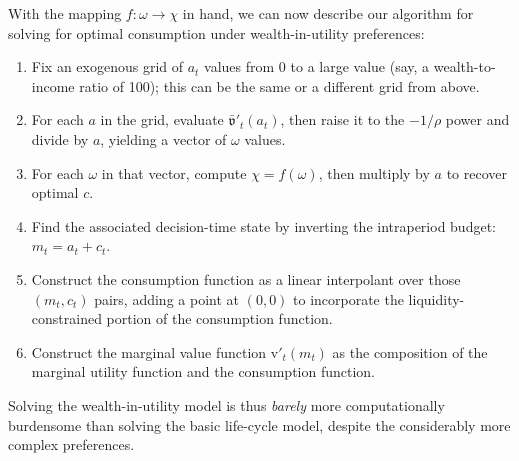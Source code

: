 \documentclass[12pt,letterpaper, fleqn]{article}
\newcommand{\CRRA}{\rho}
\newcommand{\vFunc}{\mathrm{v}}
\newcommand{\cNrm}{c}
\newcommand{\mNrm}{m}
\newcommand{\aNrm}{a}
\begin{document}
With the mapping $f : \omega \rightarrow \chi$ in hand, we can now describe our algorithm for solving for optimal consumption under wealth-in-utility preferences:

\begin{enumerate}
\item Fix an exogenous grid of $\aNrm_t$ values from 0 to a large value (say, a wealth-to-income ratio of 100); this can be the same or a different grid from above.

\item For each $\aNrm$ in the grid, evaluate $\bar{\mathfrak{v}}'_t(\aNrm_t)$, then raise it to the $-1/\CRRA$ power and divide by $\aNrm$, yielding a vector of $\omega$ values.

\item For each $\omega$ in that vector, compute $\chi = f(\omega)$, then multiply by $\aNrm$ to recover optimal $\cNrm$.

\item Find the associated decision-time state by inverting the intraperiod budget: $\mNrm_t = \aNrm_t + \cNrm_t$.

\item Construct the consumption function as a linear interpolant over those $(\mNrm_t, \cNrm_t)$ pairs, adding a point at $(0,0)$ to incorporate the liquidity-constrained portion of the consumption function.

\item Construct the marginal value function $\vFunc'_t(\mNrm_t)$ as the composition of the marginal utility function and the consumption function.
\end{enumerate}

Solving the wealth-in-utility model is thus \textit{barely} more computationally burdensome than solving the basic life-cycle model, despite the considerably more complex preferences.
\end{document}
